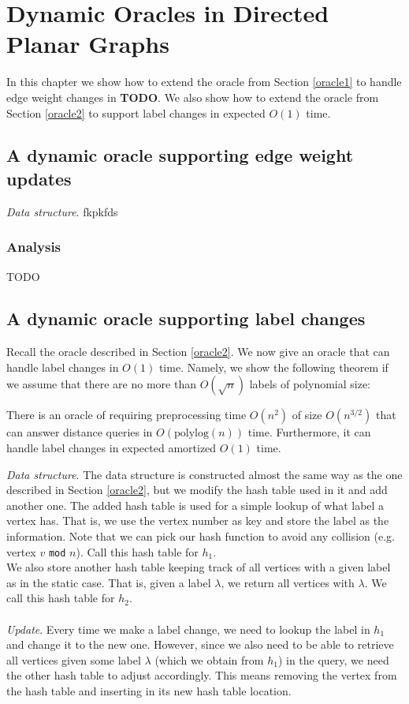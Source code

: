 \section{Dynamic Oracles in Directed Planar Graphs}\label{dynamicPlanar}
In this chapter we show how to extend the oracle from Section \ref{oracle1} to handle
edge weight changes in \textbf{TODO}. We also show how to extend the oracle from Section
\ref{oracle2} to support label changes in expected $O(1)$ time.

\subsection{A dynamic oracle supporting edge weight updates}\label{oracle3}

\indent \textit{Data structure}.
fkpkfds


\subsubsection{Analysis}
TODO

\subsection{A dynamic oracle supporting label changes}\label{oracle4}
Recall the oracle described in Section \ref{oracle2}. We now give an oracle that can
handle label changes in $O(1)$ time. Namely, we show the following theorem if we assume
that there are no more than $O(\sqrt{n})$ labels of polynomial size:
\begin{thm}\label{thm3}
  There is an oracle of requiring preprocessing time $O(n^2)$ of size $O(n^{3/2})$ that
  can answer distance queries in $O(\text{polylog}(n))$ time. Furthermore, it can handle
  label changes in expected amortized $O(1)$ time.
\end{thm}
\textit{Data structure}.
The data structure is constructed almost the same way as the one described in Section
\ref{oracle2}, but we modify the hash table used in it and add another one. The added
hash table is used for a simple lookup of what label a vertex has. That is, we use the
vertex number as key and store the label as the information. Note that we can pick our
hash function to avoid any collision (e.g. vertex $v$ \texttt{mod} $n$). Call this hash
table for $h_1$. \\
We also store another hash table keeping track of all vertices with a given label as in
the static case. That is, given a label $\lambda$, we return all vertices with $\lambda$.
We call this hash table for $h_2$. \\
\\
\indent\textit{Update}.
Every time we make a label change, we need to lookup the label in $h_1$ and change
it to the new one. However, since we also need to be able to retrieve all vertices given some label
$\lambda$ (which we obtain from $h_1$) in the query, we need the other hash table to adjust accordingly. This means
removing the vertex from the hash table and inserting in its new hash table location.

